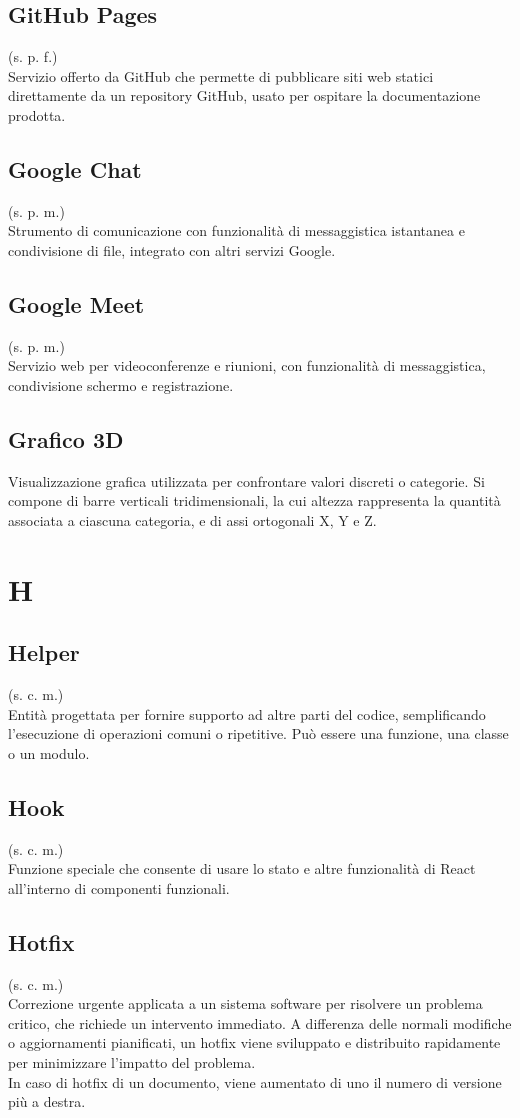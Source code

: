 \subsection{GitHub Pages}
\label{GitHub Pages}
(s. p. f.)\\
Servizio offerto da GitHub che permette di pubblicare siti web statici direttamente da un repository GitHub,
usato per ospitare la documentazione prodotta.
\subsection{Google Chat}
(s. p. m.)\\
Strumento di comunicazione con funzionalità di messaggistica
istantanea e condivisione di file, integrato con altri servizi Google.
\subsection{Google Meet}
(s. p. m.)\\
Servizio web per videoconferenze e riunioni, con funzionalità di messaggistica,
condivisione schermo e registrazione.
\subsection{Grafico 3D}
Visualizzazione grafica utilizzata per confrontare valori discreti o categorie.
Si compone di barre verticali tridimensionali, la cui altezza rappresenta la
quantità associata a ciascuna categoria, e di assi ortogonali X, Y e Z.
\pagebreak
\section{H}
\subsection{Helper}
(s. c. m.)\\
Entità progettata per fornire supporto ad altre parti del codice,
semplificando l'esecuzione di operazioni comuni o ripetitive.
Può essere una funzione, una classe o un modulo.
\subsection{Hook}
(s. c. m.)\\
Funzione speciale che consente di usare lo stato e altre funzionalità di React all'interno di componenti funzionali.
\subsection{Hotfix}
(s. c. m.)\\
Correzione urgente applicata a un sistema software per risolvere un problema critico,
che richiede un intervento immediato. A differenza delle normali modifiche o aggiornamenti pianificati,
un hotfix viene sviluppato e distribuito rapidamente per minimizzare l'impatto del problema.\\
In caso di hotfix di un documento, viene aumentato di uno il numero di versione più a destra.
